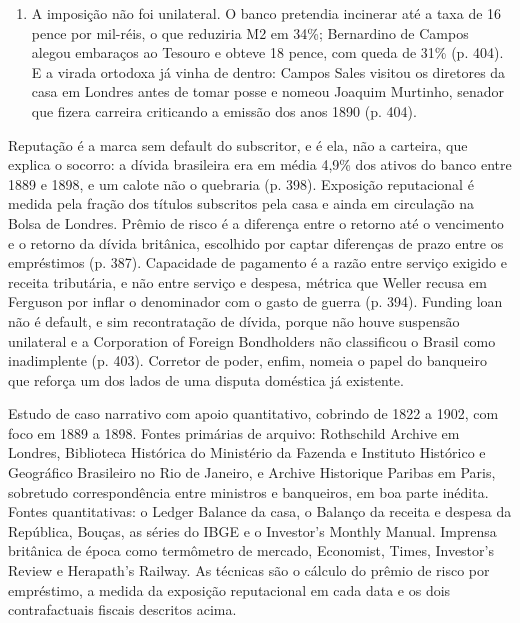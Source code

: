\begin{enumerate}[nosep]
\item A imposição não foi unilateral. O banco pretendia incinerar até a taxa de
16 pence por mil-réis, o que reduziria M2 em 34\%; Bernardino de Campos alegou
embaraços ao Tesouro e obteve 18 pence, com queda de 31\% (p. 404). E a virada
ortodoxa já vinha de dentro: Campos Sales visitou os diretores da casa em
Londres antes de tomar posse e nomeou Joaquim Murtinho, senador que fizera
carreira criticando a emissão dos anos 1890 (p. 404).
\end{enumerate}


Reputação é a marca sem default do subscritor, e é ela, não a carteira, que
explica o socorro: a dívida brasileira era em média 4,9\% dos ativos do banco
entre 1889 e 1898, e um calote não o quebraria (p. 398). Exposição reputacional
é medida pela fração dos títulos subscritos pela casa e ainda em circulação na
Bolsa de Londres. Prêmio de risco é a diferença entre o retorno até o vencimento
e o retorno da dívida britânica, escolhido por captar diferenças de prazo entre
os empréstimos (p. 387). Capacidade de pagamento é a razão entre serviço exigido
e receita tributária, e não entre serviço e despesa, métrica que Weller recusa
em Ferguson por inflar o denominador com o gasto de guerra (p. 394). Funding
loan não é default, e sim recontratação de dívida, porque não houve suspensão
unilateral e a Corporation of Foreign Bondholders não classificou o Brasil como
inadimplente (p. 403). Corretor de poder, enfim, nomeia o papel do banqueiro que
reforça um dos lados de uma disputa doméstica já existente.


Estudo de caso narrativo com apoio quantitativo, cobrindo de 1822 a 1902, com
foco em 1889 a 1898. Fontes primárias de arquivo: Rothschild Archive em Londres,
Biblioteca Histórica do Ministério da Fazenda e Instituto Histórico e Geográfico
Brasileiro no Rio de Janeiro, e Archive Historique Paribas em Paris, sobretudo
correspondência entre ministros e banqueiros, em boa parte inédita. Fontes
quantitativas: o Ledger Balance da casa, o Balanço da receita e despesa da
República, Bouças, as séries do IBGE e o Investor's Monthly Manual. Imprensa
britânica de época como termômetro de mercado, Economist, Times, Investor's
Review e Herapath's Railway. As técnicas são o cálculo do prêmio de risco por
empréstimo, a medida da exposição reputacional em cada data e os dois
contrafactuais fiscais descritos acima.

